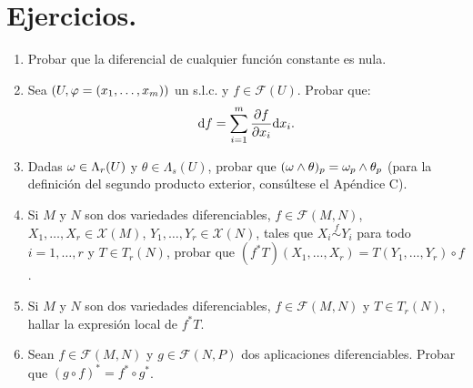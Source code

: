 \documentclass[cursovd_portada.tex]{subfiles}
\begin{document}
\section{Ejercicios.}
\begin{enumerate}
\item Probar que la diferencial de cualquier función constante
es nula. \item Sea $(U,\varphi=(x_1,\dots, x_m))$ un s.l.c. y
$f\in\mathcal{F}(U)$. Probar que:
$${\rm d} f=\sum_{i=1}^m\displaystyle{\frac{\partial f}{\partial x_i}}{\rm d} x_i.$$
\item Dadas $\omega\in\Lambda_r(U)$ y $\theta\in\Lambda_s(U)$, probar
que $(\omega\wedge\theta)_p=\omega_p\wedge\theta_p$ (para la
definición del segundo producto exterior, consúltese el
Apéndice C). \item Si $M$ y $N$ son dos variedades
diferenciables, $f\in\mathcal{F}(M,N)$, $X_1,\dots
,X_r\in\mathcal{X}(M)$, $Y_1,\dots ,Y_r\in\mathcal{X}(N)$, tales
que $X_i\stackrel{f}\sim Y_i$ para todo $i=1,\dots ,r$ y $T\in
T_r(N)$, probar que $(f^*T)(X_1,\dots ,X_r)=T(Y_1,\dots ,Y_r)\circ
f$. \item Si $M$ y $N$ son dos variedades diferenciables,
$f\in\mathcal{F}(M,N)$ y $T\in T_r(N)$, hallar la expresión
local de $f^*T$. \item Sean $f\in\mathcal{F}(M,N)$ y
$g\in\mathcal{F}(N,P)$ dos aplicaciones diferenciables. Probar que
$(g\circ f)^*=f^*\circ g^*$.
\end{enumerate}
\end{document}
